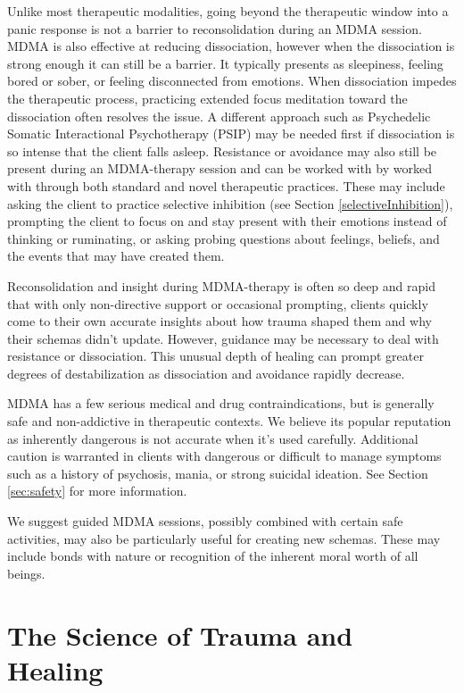 \documentclass[12pt,letterpaper]{article}
\begin{document}
Unlike most therapeutic modalities, going beyond the therapeutic window into a panic response is not a barrier to reconsolidation during an MDMA session. MDMA is also effective at reducing dissociation, however when the dissociation is strong enough it can still be a barrier. It typically presents as sleepiness, feeling bored or sober, or feeling disconnected from emotions. When dissociation impedes the therapeutic process, practicing extended focus meditation toward the dissociation often resolves the issue. A different approach such as Psychedelic Somatic Interactional Psychotherapy (PSIP) may be needed first if dissociation is so intense that the client falls asleep. Resistance or avoidance may also still be present during an MDMA-therapy session and can be worked with by worked with through both standard and novel therapeutic practices. These may include asking the client to practice selective inhibition (see Section \ref{selectiveInhibition}), prompting the client to focus on and stay present with their emotions instead of thinking or ruminating, or asking probing questions about feelings, beliefs, and the events that may have created them.

Reconsolidation and insight during MDMA-therapy is often so deep and rapid that with only non-directive support or occasional prompting, clients quickly come to their own accurate insights about how trauma shaped them and why their schemas didn't update. However, guidance may be necessary to deal with resistance or dissociation. This unusual depth of healing can prompt greater degrees of destabilization as dissociation and avoidance rapidly decrease.

MDMA has a few serious medical and drug contraindications, but is generally safe and non-addictive in therapeutic contexts. We believe its popular reputation as inherently dangerous is not accurate when it's used carefully. Additional caution is warranted in clients with dangerous or difficult to manage symptoms such as a history of psychosis, mania, or strong suicidal ideation. See Section \ref{sec:safety} for more information.

We suggest guided MDMA sessions, possibly combined with certain safe activities, may also be particularly useful for creating new schemas. These may include bonds with nature or recognition of the inherent moral worth of all beings.
\section{The Science of Trauma and Healing}
\end{document}
